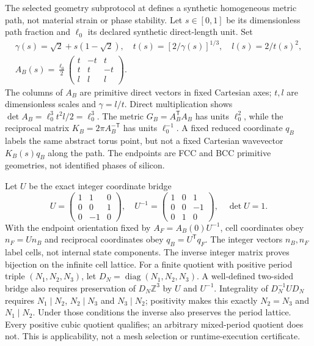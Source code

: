 The selected geometry subprotocol at
defines a synthetic homogeneous metric path, not material strain or phase
stability. Let $s\in[0,1]$ be its dimensionless path fraction and $\ell_0$
its declared synthetic direct-length unit. Set
\begin{equation}
 \begin{gathered}
 \gamma(s)=\sqrt2+s(1-\sqrt2),\quad
 t(s)=[2/\gamma(s)]^{1/3},\quad l(s)=2/t(s)^2,\\
 A_B(s)=\frac{\ell_0}{2}
 \begin{pmatrix}t&-t&t\\t&t&-t\\l&l&l\end{pmatrix}.
 \end{gathered}
 \label{eq:auxiliary-bain-metric-path}
\end{equation}
The columns of $A_B$ are primitive direct vectors in fixed Cartesian axes;
$t,l$ are dimensionless scales and $\gamma=l/t$. Direct multiplication
shows $\det A_B=\ell_0^3t^2l/2=\ell_0^3$.
The metric $G_B=A_B^{\mathsf T}A_B$ has units $\ell_0^2$, while the
reciprocal matrix $K_B=2\pi A_B^{-\mathsf T}$ has units $\ell_0^{-1}$.
A fixed reduced coordinate $q_B$ labels the same abstract torus point, but
not a fixed Cartesian wavevector $K_B(s)q_B$ along the path. The endpoints
are FCC and BCC primitive geometries, not identified phases of silicon.

Let $U$ be the exact integer coordinate bridge
\begin{equation}
 U=\begin{pmatrix}1&1&0\\0&0&1\\0&-1&0\end{pmatrix},\quad
 U^{-1}=\begin{pmatrix}1&0&1\\0&0&-1\\0&1&0\end{pmatrix},\quad \det U=1.
 \label{eq:auxiliary-bain-integer-bridge}
\end{equation}
With the endpoint orientation fixed by $A_F=A_B(0)U^{-1}$, cell coordinates
obey $n_F=Un_B$ and reciprocal coordinates obey $q_B=U^{\mathsf T}q_F$.
The integer vectors $n_B,n_F$ label cells, not internal state components.
The inverse integer matrix proves bijection on the infinite cell lattice.
For a finite quotient with positive period triple $(N_1,N_2,N_3)$,
let $D_N=\operatorname{diag}(N_1,N_2,N_3)$. A well-defined two-sided bridge
also requires preservation of $D_N\mathbb Z^3$ by $U$ and $U^{-1}$.
Integrality of $D_N^{-1}UD_N$ requires
$N_1\mid N_2$, $N_2\mid N_3$ and $N_3\mid N_2$; positivity makes this
exactly $N_2=N_3$ and $N_1\mid N_2$. Under those conditions the inverse
also preserves the period lattice. Every positive cubic quotient qualifies;
an arbitrary mixed-period quotient does not. This is applicability, not a
mesh selection or runtime-execution certificate.

